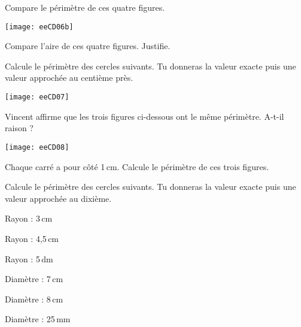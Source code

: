 


\begin{exercice}[Comparaison]

\begin{colenumerate}{1} 
\item Compare le périmètre de ces quatre figures. 

\begin{center}
    \texttt{[image: eeCD06b]}
\end{center}
\item Compare l'aire de ces quatre figures. Justifie.
\end{colenumerate} 
\end{exercice}


\begin{exercice}[]
Calcule le périmètre des cercles suivants. Tu donneras la valeur exacte puis une valeur approchée au centième près.  

\begin{center}
    \texttt{[image: eeCD07]}
\end{center}
\end{exercice}


\begin{exercice}

\begin{colenumerate}{1} 
\item Vincent affirme que les trois figures ci-dessous ont le même périmètre. A-t-il raison ?
 
\begin{center}
    \texttt{[image: eeCD08]}
\end{center}

\item Chaque carré a pour côté 1\,cm. Calcule le périmètre de ces trois figures.
\end{colenumerate} 
 
\end{exercice}

\begin{exercice}[]
Calcule le périmètre des cercles suivants. Tu donneras la valeur exacte puis une valeur approchée au dixième.

\begin{colenumerate}{2} 
\item Rayon : 3\,cm 
\item Rayon : 4,5\,cm
\item Rayon : 5\,dm
\item Diamètre : 7\,cm
\item Diamètre : 8\,cm
\item Diamètre : 25\,mm
\end{colenumerate} 
\end{exercice}

